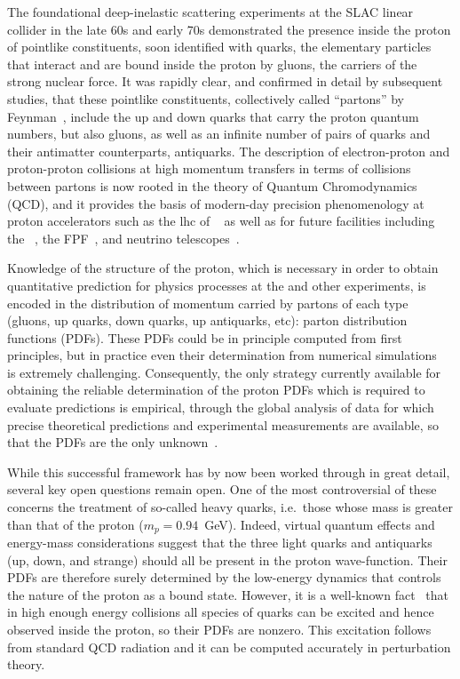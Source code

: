 
The foundational deep-inelastic scattering experiments at the SLAC linear collider
in the late 60s and early 70s demonstrated the presence inside the
proton of pointlike  constituents, soon identified with quarks, the
elementary particles that interact and are bound inside the proton by
gluons, the carriers of the strong  nuclear force.
%
It was rapidly clear, and confirmed in detail by subsequent studies,
that these pointlike constituents, collectively called ``partons'' by
Feynman~\cite{Feynman:1969wa}, include the up and down quarks that
carry the proton quantum numbers, but also gluons, as well
as an infinite number of pairs of quarks and their
antimatter counterparts, antiquarks.
%
The description of electron-proton and proton-proton collisions at high
momentum transfers in terms of collisions between partons is now rooted in the
theory of Quantum  Chromodynamics (QCD), and it provides the basis of
modern-day precision phenomenology at proton accelerators such as the
\acrfull{lhc} of \cern~\cite{Gao:2017yyd} as well as for future facilities
including the \eic~\cite{AbdulKhalek:2021gbh}, the FPF~\cite{Feng:2022inv}, and 
neutrino telescopes~\cite{IceCube-Gen2:2020qha}.

Knowledge of the structure of the proton, which is necessary in order
to obtain
quantitative prediction for physics processes at the \lhc and other
experiments, is encoded in
the distribution of  momentum carried by partons of each type
(gluons, up quarks, down quarks, up antiquarks, etc):
parton distribution functions (PDFs).
%
These PDFs could be in principle
computed from first principles, but in
practice even their determination from numerical
simulations~\cite{Constantinou:2020hdm} is extremely challenging.
%
Consequently,  the only 
strategy currently available for obtaining the
reliable determination of the proton PDFs which is required to evaluate \lhc
predictions is empirical, through the global analysis of
data for which precise theoretical predictions and experimental
measurements are available, so that the PDFs are the only
unknown~\cite{Gao:2017yyd}.

While this successful framework has by now been worked through in great detail, several key open questions remain open.
%
One of the most controversial of these concerns the treatment of
so-called heavy quarks, i.e.\ those whose mass is greater than that of
the proton ($m_p=0.94$~GeV). Indeed, virtual quantum effects and
energy-mass considerations suggest that the three light quarks and
antiquarks (up, 
down, and strange) should all be present in the proton
wave-function.
%
Their PDFs are therefore surely determined by the low-energy
dynamics that controls the nature of the proton as a bound
state.
%
However, it is a well-known fact~\cite{DeRoeck:2011na,
  Kovarik:2019xvh,Gao:2017yyd,Rojo:2019uip}
that in high enough energy collisions all species of quarks can be
excited and hence observed
inside the proton, so their PDFs are nonzero.
%
This excitation
follows from standard QCD radiation and it can be computed accurately
in perturbation theory.

